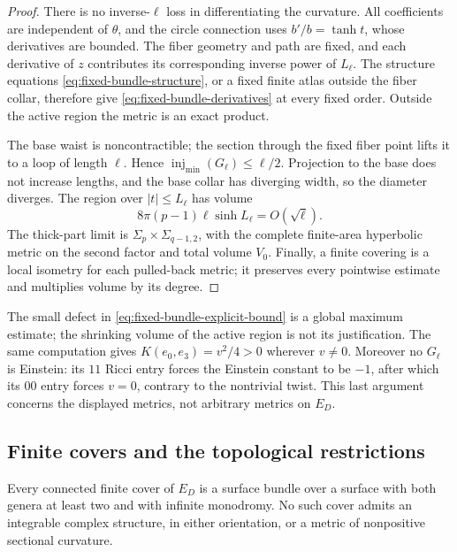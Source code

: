 \begin{proof}
There is no inverse-$\ell$ loss in differentiating the curvature.
All coefficients are independent of $\theta$, and the circle
connection uses $b'/b=\tanh t$, whose derivatives are bounded.
The fiber geometry and path are fixed, and each derivative of $z$
contributes its corresponding inverse power of $L_\ell$.
The structure equations \eqref{eq:fixed-bundle-structure}, or a fixed
finite atlas outside the fiber collar, therefore give
\eqref{eq:fixed-bundle-derivatives} at every fixed order.  Outside the
active region the metric is an exact product.

The base waist is noncontractible; the section through the fixed
fiber point lifts it to a loop of length $\ell$.  Hence
$\operatorname{inj}_{\min}(G_\ell)\le\ell/2$.  Projection to the base
does not increase lengths, and the base collar has diverging width,
so the diameter diverges.  The region over $|t|\le L_\ell$ has volume
\[
 8\pi(p-1)\ell\sinh L_\ell=O(\sqrt\ell).
\]
The thick-part limit is
$\Sigma_p\times\Sigma_{q-1,2}$, with the complete finite-area
hyperbolic metric on the second factor and total volume $V_0$.
Finally, a finite covering is a local isometry for each pulled-back
metric; it preserves every pointwise estimate and multiplies volume
by its degree.
\end{proof}

\begin{remark}\label{rem:fixed-bundle-pointwise}
The small defect in \eqref{eq:fixed-bundle-explicit-bound} is a global
maximum estimate; the shrinking volume of the active region is not
its justification.  The same computation gives
$K(e_0,e_3)=v^2/4>0$ wherever $v\ne0$.  Moreover no $G_\ell$ is
Einstein: its $11$ Ricci entry forces the Einstein constant to be
$-1$, after which its $00$ entry forces $v=0$, contrary to the
nontrivial twist.  This last argument concerns the displayed metrics,
not arbitrary metrics on $E_D$.
\end{remark}

\subsection{Finite covers and the topological restrictions}

\begin{proposition}\label{prop:fixed-bundle-cover-obstructions}
Every connected finite cover of $E_D$ is a surface bundle over a
surface with both genera at least two and with infinite monodromy.
No such cover admits an integrable complex structure, in either
orientation, or a metric of nonpositive sectional curvature.
\end{proposition}

